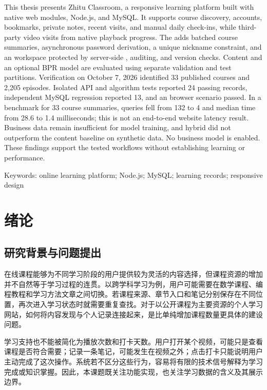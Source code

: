 \documentclass[UTF8,12pt,a4paper,oneside,openany]{ctexbook}
\begin{document}
This thesis presents Zhitu Classroom, a responsive learning platform built with native web modules, Node.js, and MySQL. It supports course discovery, accounts, bookmarks, private notes, recent visits, and manual daily check-ins, while  third-party video visits from native playback progress. The  adds batched course summaries, asynchronous password derivation, a unique nickname constraint, and an  workspace protected by server-side ,  auditing, and version checks. Content  and an optional BPR model are evaluated using separate validation and test partitions. Verification on October 7, 2026 identified 33 published courses and 2,205 episodes. Isolated API and algorithm tests reported 24 passing records, independent MySQL regression reported 13, and an  browser scenario passed. In a  benchmark for 33 course summaries, queries fell from 132 to 4 and median time from 28.6 to 1.4 milliseconds; this is not an end-to-end website latency result. Business data remain insufficient for model training, and hybrid  did not outperform the content baseline on synthetic data. No business  model is enabled. These findings support the tested workflows without establishing learning  or  performance.


Keywords: online learning platform; Node.js; MySQL; learning records; responsive design


\tableofcontents
\mainmatter
\chapter{绪论}

\section{研究背景与问题提出}

在线课程能够为不同学习阶段的用户提供较为灵活的内容选择，但课程资源的增加并不自然等于学习过程的连贯。以跨学科学习为例，用户可能需要在数学课程、编程教程和学习方法文章之间切换。若课程来源、章节入口和笔记分别保存在不同位置，再次进入学习状态时就需要重复查找。对于以公开课程为主要资源的个人学习网站，如何将内容发现与个人记录连接起来，是比单纯增加课程数量更具体的建设问题。


学习支持也不能被简化为播放次数和打卡天数。用户打开某个视频，可能只是查看课程是否符合需要；记录一条笔记，可能发生在视频之外；点击打卡只能说明用户主动完成了这次操作。系统若不区分这些行为，容易将有限的技术信号解释为学习完成或知识掌握。因此，本课题既关注功能实现，也关注学习数据的含义及其展示边界。
\end{document}
